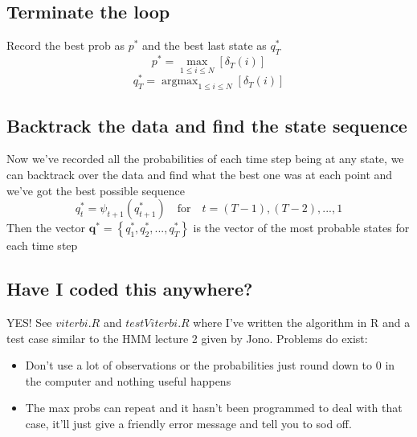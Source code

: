 \documentclass[]{article}
\DeclareMathOperator*{\argmax}{argmax} %
\begin{document}
		\subsection{Terminate the loop}
			Record the best prob as $p^*$ and the best last state as $q_T^*$
			\begin{equation}
				p^*=\max_{1\le i \le N}\left[ \delta_T(i)\right] 
			\end{equation}
			\begin{equation}
				q_T^*=\argmax_{1\le i \le N}\left[ \delta_T(i)\right] 
			\end{equation}
		\subsection{Backtrack the data and find the state sequence}
			Now we've recorded all the probabilities of each time step being at any state, we can backtrack over the data and find what the best one was at each point and we've got the best possible sequence
			\begin{equation}
				q_t^*=\psi_{t+1}(q^*_{t+1}) \quad \text{for} \quad t= (T-1), (T-2), ..., 1
			\end{equation}
			Then the vector $\mathbf{q^*}=\left\lbrace q^*_1, q^*_2, ..., q^*_T \right\rbrace $ is the vector of the most probable states for each time step
		\subsection{Have I coded this anywhere?}
			YES! See $viterbi.R$ and $testViterbi.R$ where I've written the algorithm in R and a test case similar to the HMM lecture 2 given by Jono. Problems do exist:
			\begin{itemize}
				\item Don't use a lot of observations or the probabilities just round down to 0 in the computer and nothing useful happens
				\item The max probs can repeat and it hasn't been programmed to deal with that case, it'll just give a friendly error message and tell you to sod off.
			\end{itemize}
\end{document}

